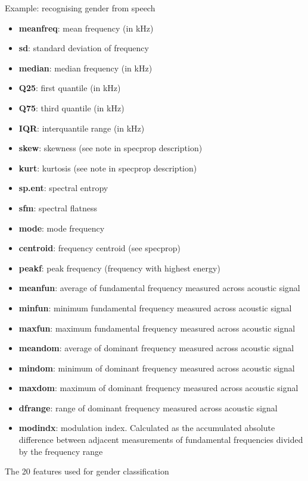 \documentclass[compress]{beamer}
\begin{document}
\begin{frame}{Example: recognising gender from speech}

\begin{itemize}

\item \textbf{meanfreq}: mean frequency (in kHz)
\item \textbf{sd}: standard deviation of frequency
\item \textbf{median}: median frequency (in kHz)
\item \textbf{Q25}: first quantile (in kHz)
\item \textbf{Q75}: third quantile (in kHz)
\item \textbf{IQR}: interquantile range (in kHz)
\item \textbf{skew}: skewness (see note in specprop description)
\item \textbf{kurt}: kurtosis (see note in specprop description)
\item \textbf{sp.ent}: spectral entropy
\item \textbf{sfm}: spectral flatness
\item \textbf{mode}: mode frequency
\item \textbf{centroid}: frequency centroid (see specprop)
\item \textbf{peakf}: peak frequency (frequency with highest energy)
\end{itemize}

\begin{itemize}

\item \textbf{meanfun}: average of fundamental frequency measured across
  acoustic signal
\item \textbf{minfun}: minimum fundamental frequency measured across
  acoustic signal
\item \textbf{maxfun}: maximum fundamental frequency measured across
  acoustic signal
\item \textbf{meandom}: average of dominant frequency measured across
  acoustic signal
\item \textbf{mindom}: minimum of dominant frequency measured across
  acoustic signal
\item \textbf{maxdom}: maximum of dominant frequency measured across
  acoustic signal
\item \textbf{dfrange}: range of dominant frequency measured across acoustic
  signal
\item \textbf{modindx}: modulation index. Calculated as the accumulated
  absolute difference between adjacent measurements of fundamental
  frequencies divided by the frequency range
\end{itemize}

The 20 features used for gender classification

\end{frame}
\end{document}
